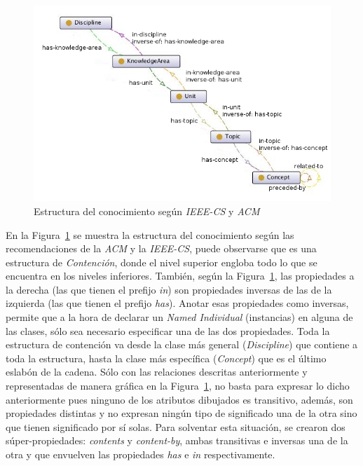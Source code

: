 \begin{itemize}
\begin{figure}[h!]
    \begin{center}
        \includegraphics[scale=0.5]{images/onto_knowledge_structure.jpg}
        \caption{Estructura del conocimiento según \textit{IEEE-CS} y \textit{ACM}}
        \label{knowledgeStructure}
    \end{center}
\end{figure}

En la Figura~\ref{knowledgeStructure} se muestra la estructura del conocimiento según las recomendaciones de la \textit{ACM} y la \textit{IEEE-CS}, puede observarse que es una estructura de \textit{Contención}, donde el nivel superior engloba todo lo que se encuentra en los niveles inferiores. También, según la Figura~\ref{knowledgeStructure}, las propiedades a la derecha (las que tienen el prefijo \textit{in}) son propiedades inversas de las de la izquierda (las que tienen el prefijo \textit{has}). Anotar esas propiedades como inversas, permite que a la hora de declarar un \textit{Named Individual} (instancias) en alguna de las clases, sólo sea necesario especificar una de las dos propiedades. Toda la estructura de contención va desde la clase más general (\textit{Discipline}) que contiene a toda la estructura, hasta la clase más específica (\textit{Concept}) que es el último eslabón de la cadena. Sólo con las relaciones descritas anteriormente y representadas de manera gráfica en la Figura~\ref{knowledgeStructure}, no basta para expresar lo dicho anteriormente pues ninguno de los atributos dibujados es transitivo, además, son propiedades distintas y no expresan ningún tipo de significado una de la otra sino que tienen significado por sí solas. Para solventar esta situación, se crearon dos súper-propiedades: \textit{contents} y \textit{content-by}, ambas transitivas e inversas una de la otra y que envuelven las propiedades \textit{has} e \textit{in} respectivamente.


\end{itemize}
